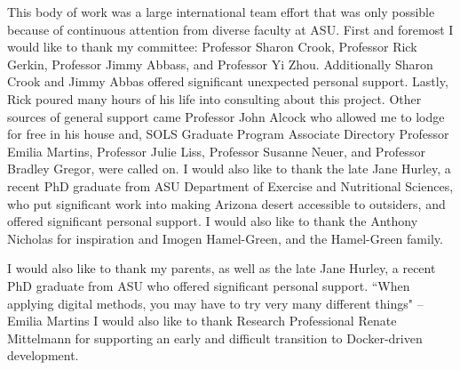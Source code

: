 This body of work was a large international team effort that was only possible because of continuous attention from diverse faculty at ASU. 
\linebreak 
\linebreak 
First and foremost I would like to thank my committee: Professor Sharon Crook, Professor Rick Gerkin, Professor Jimmy Abbass, and Professor Yi Zhou. 
Additionally Sharon Crook and Jimmy Abbas offered significant unexpected personal support.
Lastly, Rick poured many hours of his life into consulting about this project.
\linebreak 
\linebreak 
Other sources of general support came Professor John Alcock who allowed me to lodge for free in his house and, SOLS Graduate Program Associate Directory Professor Emilia Martins, Professor Julie Liss, Professor Susanne Neuer, and Professor Bradley Gregor, were called on.
\linebreak 
\linebreak 
I would also like to thank the late Jane Hurley, a recent PhD graduate from ASU Department of Exercise and Nutritional Sciences, who put significant work into making Arizona desert accessible to outsiders, and offered significant personal support.
I would also like to thank the Anthony Nicholas for inspiration and Imogen Hamel-Green, and the Hamel-Green family.

\linebreak 
\linebreak 
I would also like to thank my parents, as well as the late Jane Hurley, a recent PhD graduate from ASU who offered significant personal support.
\linebreak 
\linebreak 
``When applying digital methods, you may have to try very many different things" -- Emilia Martins
\linebreak 
\linebreak 
I would also like to thank Research Professional Renate Mittelmann for supporting an early and difficult transition to Docker-driven development.
